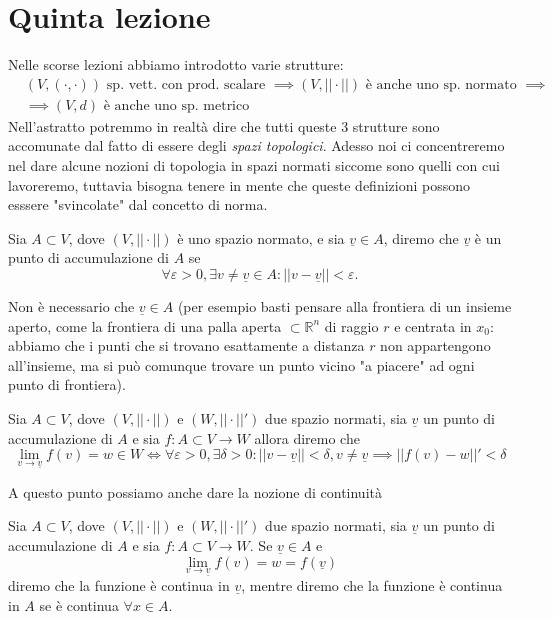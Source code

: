 \documentclass[12pt, twoside, italian, openany]{book}
\begin{document}
	\chapter{Quinta lezione}
	Nelle scorse lezioni abbiamo introdotto varie strutture:
	\begin{align*}
	&(V, (\cdot, \cdot)) \text{ sp. vett. con prod. scalare } \implies (V, ||\cdot||) \text{ è anche uno sp. normato } \implies \\
	&\implies (V, d) \text{ è anche uno sp. metrico}
	\end{align*}
	Nell'astratto potremmo in realtà dire che tutti queste $3$ strutture sono accomunate dal fatto di essere degli \emph{spazi topologici}. Adesso noi ci concentreremo nel dare alcune nozioni di topologia in spazi normati siccome sono quelli con cui lavoreremo, tuttavia bisogna tenere in mente che queste definizioni possono esssere "svincolate" dal concetto di norma.
	\begin{definition}
		Sia $A \subset V$, dove $(V, ||\cdot||)$ è uno spazio normato, e sia $\underline{v} \in A$, diremo che $\underline{v}$ è un punto di accumulazione di $A$ se
		$$
		\forall \varepsilon > 0, \exists v \neq \underline{v} \in A: || v - \underline{v} || < \varepsilon.
		$$
	\end{definition}
	\begin{remark}
		Non è necessario che $\underline{v} \in A$ (per esempio basti pensare alla frontiera di un insieme aperto, come la frontiera di una palla aperta $\subset \mathbb{R}^n$ di raggio $r$ e centrata in $x_0$: abbiamo che i punti che si trovano esattamente a distanza $r$ non appartengono all'insieme, ma si può comunque trovare un punto vicino "a piacere" ad ogni punto di frontiera).
	\end{remark}
	\begin{definition}
		Sia $A \subset V$, dove $(V, || \cdot ||)$ e $(W, ||\cdot||')$ due spazio normati, sia $\underline{v}$ un punto di accumulazione di $A$ e sia $f: A \subset V \to W$ allora diremo che
		$$
			\lim_{v \to \underline{v}} f(v) = w \in W \iff \forall \varepsilon > 0, \exists \delta > 0: || v - \underline{v} || < \delta, v \neq \underline{v} \implies || f(v) - w ||' < \delta 
		$$
	\end{definition}
	A questo punto possiamo anche dare la nozione di continuità
	\begin{definition}
		Sia $A \subset V$, dove $(V, || \cdot ||)$ e $(W, ||\cdot||')$ due spazio normati, sia $\underline{v}$ un punto di accumulazione di $A$ e sia $f: A \subset V \to W$. Se $\underline{v} \in A$ e
		$$
			\lim_{v \to \underline{v}} f(v) = w = f(\underline{v})
		$$
		diremo che la funzione è continua in $\underline{v}$, mentre diremo che la funzione è continua in $A$ se è continua $\forall x \in A$.
	\end{definition}
\end{document}
